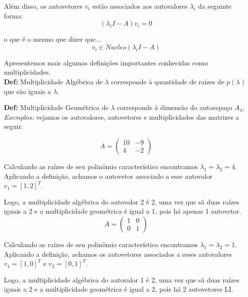 \documentclass[12pt]{article}
\begin{document}
Além disso, os autovetores $v_i$ estão associados aos autovalores $\lambda_i$ da seguinte forma:
\begin{equation*}
	(\lambda_iI-A)v_i=0
\end{equation*}

o que é o mesmo que dizer que...
\begin{equation*}
	v_i \in Nucleo(\lambda_iI-A)
\end{equation*}

Apresentemos mais algumas definições importantes conhecidas como multiplicidades.\\

\textbf{Def:} Multiplicidade Algébrica de $\lambda$ corresponde à quantidade de raízes de $p(\lambda)$ que são iguais a $\lambda$.

\textbf{Def:} Multiplicidade Geométrica de $\lambda$ corresponde à dimensão do autoespaço $A_{\lambda}$.\\

\textit{Exemplos:} vejamos os autovalores, autovetores e multiplicidades das matrizes a seguir.

\begin{equation*}
	A=\begin{pmatrix}
		10 & -9 \\
		4 & -2
	\end{pmatrix}	
\end{equation*}

Calculando as raízes de seu polinômio característico encontramos $\lambda_1=\lambda_2=4$. Aplicando a definição, achamos o autovetor associado a esse autovalor $v_1=[1,2]^T$. 

Logo, a multiplicidade algébrica do autovalor 2 é 2, uma vez que sã duas raízes iguais a 2 e a multiplicidade geométrica é igual a 1, pois há apenas 1 autovetor.\\

\begin{equation*}
	A=\begin{pmatrix}
		1 & 0 \\
		0 & 1
	\end{pmatrix}	
\end{equation*}

Calculando as raízes de seu polinômio característico encontramos $\lambda_1=\lambda_2=1$. Aplicando a definição, achamos os autovetores associados a esses autovalores $v_1=[1,0]^T$ e $v_2=[0,1]^T$. 

Logo, a multiplicidade algébrica do autovalor 1 é 2, uma vez que sã duas raízes iguais a 2 e a multiplicidade geométrica é igual a 2, pois há 2 autovetores LI.
\end{document}
